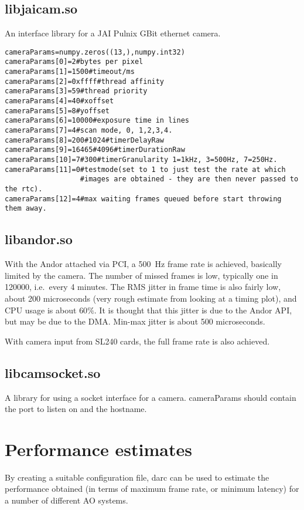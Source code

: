 \documentclass[a4,10pt]{article}
\begin{document}
\subsection{libjaicam.so}
An interface library for a JAI Pulnix GBit ethernet camera.
\begin{verbatim}
cameraParams=numpy.zeros((13,),numpy.int32)
cameraParams[0]=2#bytes per pixel
cameraParams[1]=1500#timeout/ms
cameraParams[2]=0xffff#thread affinity
cameraParams[3]=59#thread priority
cameraParams[4]=40#xoffset
cameraParams[5]=8#yoffset
cameraParams[6]=10000#exposure time in lines
cameraParams[7]=4#scan mode, 0, 1,2,3,4.
cameraParams[8]=200#1024#timerDelayRaw
cameraParams[9]=16465#4096#timerDurationRaw
cameraParams[10]=7#300#timerGranularity 1=1kHz, 3=500Hz, 7=250Hz.
cameraParams[11]=0#testmode(set to 1 to just test the rate at which
                  #images are obtained - they are then never passed to the rtc).
cameraParams[12]=4#max waiting frames queued before start throwing them away.
\end{verbatim}

\subsection{libandor.so}
With the Andor attached via PCI, a 500~Hz frame rate is achieved,
basically limited by the camera.  The number of missed frames is low,
typically one in 120000, i.e.\ every 4 minutes.  The RMS jitter in
frame time is also fairly low, about 200 microseconds (very rough
estimate from looking at a timing plot), and CPU usage is about
$60\%$.  It is thought that this jitter is due to the Andor API, but
may be due to the DMA.  Min-max jitter is about 500 microseconds.  

With camera input from SL240 cards, the full frame rate is also achieved.

\subsection{libcamsocket.so}
A library for using a socket interface for a camera.  cameraParams
should contain the port to listen on and the hostname.



\section{Performance estimates}
By creating a suitable configuration file, darc can be used to
estimate the performance obtained (in terms of maximum frame rate, or
minimum latency) for a number of different AO systems.
\end{document}
